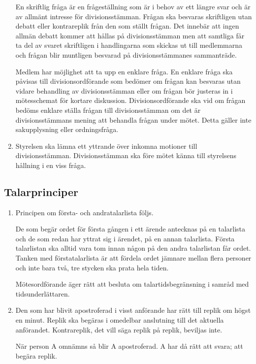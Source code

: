 \documentclass{dvd}
\begin{document}
\begin{enumerate}[label=\arabic* §, ref=\arabic*]
	      En skriftlig fråga är en frågeställning som är i behov av ett längre svar och är av allmänt intresse för divisionsstämman.
	      Frågan ska besvaras skriftligen utan debatt eller kontrareplik från den som ställt frågan.
	      Det innebär att ingen allmän debatt kommer att hållas på divisionsstämman men att samtliga får ta del av svaret skriftligen i handlingarna som skickas ut till medlemmarna och frågan blir muntligen besvarad på divisionsstämmanes sammanträde.

	      Medlem har möjlighet att ta upp en enklare fråga.
	      En enklare fråga ska påvisas till divisionsordförande som bedömer om frågan kan besvaras utan vidare behandling av divisionsstämman eller om frågan bör justeras in i mötesschemat för kortare diskussion.
	      Divisionsordförande ska vid om frågan bedöms enklare ställa frågan till divisionsstämman om det är divisionsstämmans mening att behandla frågan under mötet.
	      Detta gäller inte sakupplysning eller ordningsfråga.

	\item Styrelsen ska lämna ett yttrande över inkomna motioner till divisionsstämman.
	      Divisionsstämman ska före mötet känna till styrelsens hållning i en viss fråga.
\end{enumerate}

\subsection{Talarprinciper}

\begin{enumerate}[label=\arabic* §, ref=\arabic*]
	\item Principen om första- och andratalarlista följs.

	      De som begär ordet för första gången i ett ärende antecknas på en talarlista och de som redan har yttrat sig i ärendet, på en annan talarlista.
	      Första talarlistan ska alltid vara tom innan någon på den andra talarlistan får ordet.
	      Tanken med förstatalarlista är att fördela ordet jämnare mellan flera personer och inte bara två, tre stycken ska prata hela tiden.

	      Mötesordförande äger rätt att besluta om talartidsbegränsning i samråd med tidsunderlättaren.

	\item Den som har blivit apostroferad i visst anförande har rätt till replik om högst en minut.
	      Replik ska begäras i omedelbar anslutning till det aktuella anförandet.
	      Kontrareplik, det vill säga replik på replik, beviljas inte.

	      När person A omnämns så blir A apostroferad. A har då rätt att svara; att begära replik.
\end{enumerate}
\end{document}
